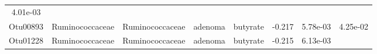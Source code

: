 \documentclass[11pt,]{article}
\begin{document}
\begin{longtable}[]{@{}cccccccc@{}}
\begin{minipage}[t]{0.08\columnwidth}
4.01e-03\strut
\end{minipage}\tabularnewline
\begin{minipage}[t]{0.08\columnwidth}\centering\strut
Otu00893\strut
\end{minipage} & \begin{minipage}[t]{0.15\columnwidth}\centering\strut
Ruminococcaceae\strut
\end{minipage} & \begin{minipage}[t]{0.15\columnwidth}\centering\strut
Ruminococcaceae\strut
\end{minipage} & \begin{minipage}[t]{0.08\columnwidth}\centering\strut
adenoma\strut
\end{minipage} & \begin{minipage}[t]{0.09\columnwidth}\centering\strut
butyrate\strut
\end{minipage} & \begin{minipage}[t]{0.07\columnwidth}\centering\strut
-0.217\strut
\end{minipage} & \begin{minipage}[t]{0.08\columnwidth}\centering\strut
5.78e-03\strut
\end{minipage} & \begin{minipage}[t]{0.08\columnwidth}\centering\strut
4.25e-02\strut
\end{minipage}\tabularnewline
\begin{minipage}[t]{0.08\columnwidth}\centering\strut
Otu01228\strut
\end{minipage} & \begin{minipage}[t]{0.15\columnwidth}\centering\strut
Ruminococcaceae\strut
\end{minipage} & \begin{minipage}[t]{0.15\columnwidth}\centering\strut
Ruminococcaceae\strut
\end{minipage} & \begin{minipage}[t]{0.08\columnwidth}\centering\strut
adenoma\strut
\end{minipage} & \begin{minipage}[t]{0.09\columnwidth}\centering\strut
butyrate\strut
\end{minipage} & \begin{minipage}[t]{0.07\columnwidth}\centering\strut
-0.215\strut
\end{minipage} & \begin{minipage}[t]{0.08\columnwidth}\centering\strut
6.13e-03\strut
\end{minipage} & \begin{minipage}[t]{0.08\columnwidth}\centering\strut

\end{minipage}
\end{longtable}
\end{document}
